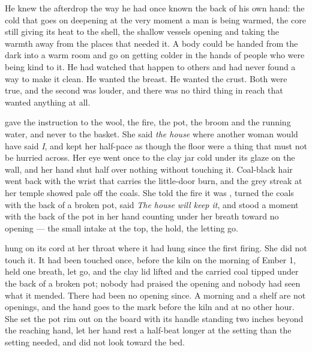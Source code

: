 He knew the afterdrop the way he had once known the back of his own hand: the cold that goes on deepening at the very moment a man is being warmed, the core still giving its heat to the shell, the shallow vessels opening and taking the warmth away from the places that needed it. A body could be handed from the dark into a warm room and go on getting colder in the hands of people who were being kind to it. He had watched that happen to others and had never found a way to make it clean. He wanted the breast. He wanted the crust. Both were true, and the second was louder, and there was no third thing in reach that wanted anything at all.

 gave the instruction to the wool, the fire, the pot, the broom and the running water, and never to the basket. She said \emph{the house} where another woman would have said \emph{I}, and kept her half-pace as though the floor were a thing that must not be hurried across. Her eye went once to the clay jar cold under its glaze on the wall, and her hand shut half over nothing without touching it. Coal-black hair went back with the wrist that carries the little-door burn, and the grey streak at her temple showed pale off the coals. She told the fire it was , turned the coals with the back of a broken pot, said \emph{The house will keep it}, and stood a moment with the back of the pot in her hand counting under her breath toward no opening --- the small intake at the top, the hold, the letting go.

 hung on its cord at her throat where it had hung since the first firing. She did not touch it. It had been touched once, before the kiln on the morning of Ember 1, held one breath, let go, and the clay lid lifted and the carried coal tipped under the back of a broken pot; nobody had praised the opening and nobody had seen what it mended. There had been no opening since. A morning and a shelf are not openings, and the hand goes to the mark before the kiln and at no other hour. She set the pot rim out on the board with its handle standing two inches beyond the reaching hand, let her hand rest a half-beat longer at the setting than the setting needed, and did not look toward the bed.

\scenebreak

